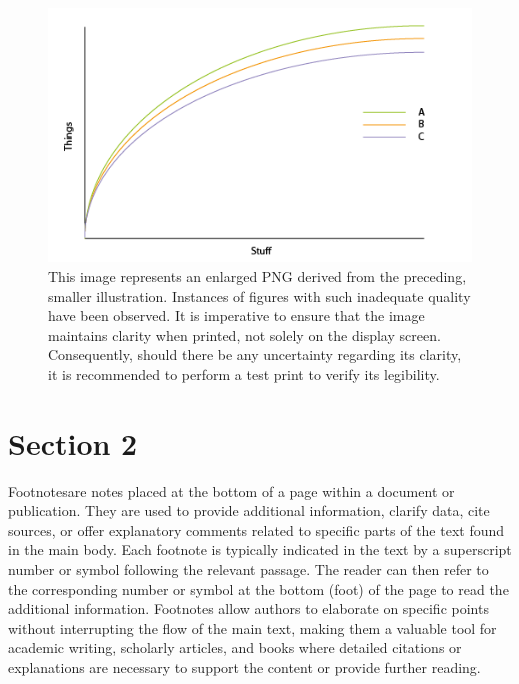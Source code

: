 \begin{figure}[ht]
\centering
\includegraphics[width=\textwidth]{images/fig001}
\caption{This image represents an enlarged PNG derived from the preceding, smaller illustration.
Instances of figures with such inadequate quality have been observed.
It is imperative to ensure that the image maintains clarity when printed, not solely on the display screen.
Consequently, should there be any uncertainty regarding its clarity, it is recommended to perform a test print to verify its legibility.}
\label{fig:fig001}
\end{figure}

\section{Section 2}
\label{sec:chap001002}

Footnotes\footnotemark[1] are notes placed at the bottom of a page within a document or publication.
They are used to provide additional information, clarify data, cite sources, or offer explanatory comments related to specific parts of the text found in the main body.
Each footnote is typically indicated in the text by a superscript number or symbol following the relevant passage.
The reader can then refer to the corresponding number or symbol at the bottom (foot) of the page to read the additional information.
Footnotes allow authors to elaborate on specific points without interrupting the flow of the main text, making them a valuable tool for academic writing, scholarly articles, and books where detailed citations or explanations are necessary to support the content or provide further reading.

